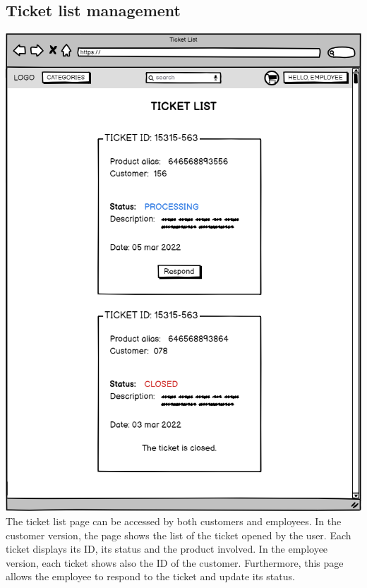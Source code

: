 \subsection{Ticket list management}
    \includegraphics[width=\textwidth,height=\textheight,keepaspectratio]{mockups/ticketPageMockup.png}
\\
The ticket list page can be accessed by both customers and employees. In the customer version, the page shows the list of the ticket opened by the user. Each ticket displays its ID, its status and the product involved. In the employee version, each ticket shows also the ID of the customer. Furthermore, this page allows the employee to respond to the ticket and update its status.


